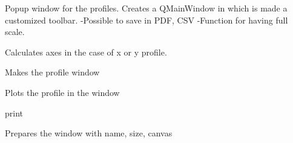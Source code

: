 \documentclass[letterpaper,10pt,openany,oneside]{sphinxmanual}
\begin{document}

\begin{fulllineitems}
\label{rst/visu2d:Visu.profile_popup.PROFILE}
Popup window for the profiles.
Creates a QMainWindow in which is made a customized toolbar.
-Possible to save in PDF, CSV
-Function for having full scale.

\begin{fulllineitems}
\label{rst/visu2d:Visu.profile_popup.PROFILE.axes_mz}
Calculates axes in the case of x or y profile.

\end{fulllineitems}


\begin{fulllineitems}
\label{rst/visu2d:Visu.profile_popup.PROFILE.make_window}
Makes the profile window

\end{fulllineitems}


\begin{fulllineitems}
\label{rst/visu2d:Visu.profile_popup.PROFILE.plot_profile}
Plots the profile in the window

\end{fulllineitems}


\begin{fulllineitems}
\label{rst/visu2d:Visu.profile_popup.PROFILE.pr}
print

\end{fulllineitems}


\begin{fulllineitems}
\label{rst/visu2d:Visu.profile_popup.PROFILE.prepare_window}
Prepares the window with name, size, canvas

\end{fulllineitems}


\end{fulllineitems}
\end{document}
